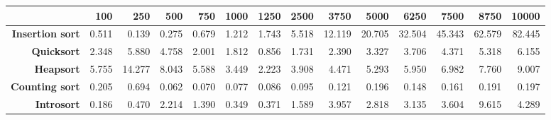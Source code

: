 \begin{tabular}{rrrrrrrrrrrrrr}
\hline
                         &   \textbf{100} &   \textbf{250} &   \textbf{500} &   \textbf{750} &   \textbf{1000} &   \textbf{1250} &   \textbf{2500} &   \textbf{3750} &   \textbf{5000} &   \textbf{6250} &   \textbf{7500} &   \textbf{8750} &   \textbf{10000} \\
\hline
 \textbf{Insertion sort} &          0.511 &          0.139 &          0.275 &          0.679 &           1.212 &           1.743 &           5.518 &          12.119 &          20.705 &          32.504 &          45.343 &          62.579 &           82.445 \\
      \textbf{Quicksort} &          2.348 &          5.880 &          4.758 &          2.001 &           1.812 &           0.856 &           1.731 &           2.390 &           3.327 &           3.706 &           4.371 &           5.318 &            6.155 \\
       \textbf{Heapsort} &          5.755 &         14.277 &          8.043 &          5.588 &           3.449 &           2.223 &           3.908 &           4.471 &           5.293 &           5.950 &           6.982 &           7.760 &            9.007 \\
  \textbf{Counting sort} &          0.205 &          0.694 &          0.062 &          0.070 &           0.077 &           0.086 &           0.095 &           0.121 &           0.196 &           0.148 &           0.161 &           0.191 &            0.197 \\
      \textbf{Introsort} &          0.186 &          0.470 &          2.214 &          1.390 &           0.349 &           0.371 &           1.589 &           3.957 &           2.818 &           3.135 &           3.604 &           9.615 &            4.289 \\
\hline
\end{tabular}